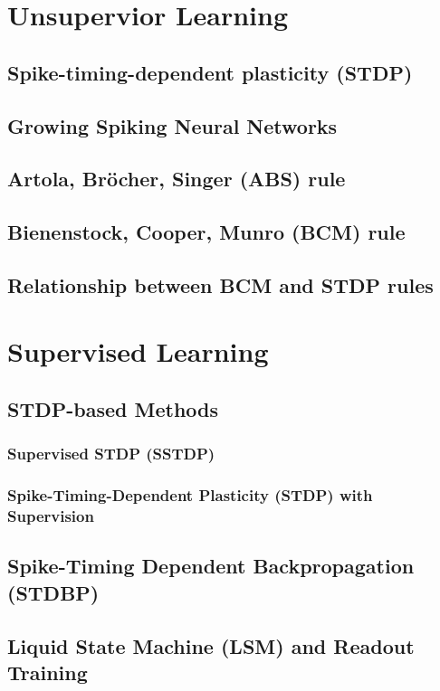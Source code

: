 \section{Unsupervior Learning}
\subsection{Spike-timing-dependent plasticity (STDP)}
\subsection{Growing Spiking Neural Networks}
\subsection{Artola, Bröcher, Singer (ABS) rule}
\subsection{Bienenstock, Cooper, Munro (BCM) rule}
\subsection{Relationship between BCM and STDP rules}

\section{Supervised Learning}

\subsection{STDP-based Methods}
\subsubsection{Supervised STDP (SSTDP)}
\subsubsection{Spike-Timing-Dependent Plasticity (STDP) with Supervision}

\subsection{Spike-Timing Dependent Backpropagation (STDBP)}

\subsection{Liquid State Machine (LSM) and Readout Training}

